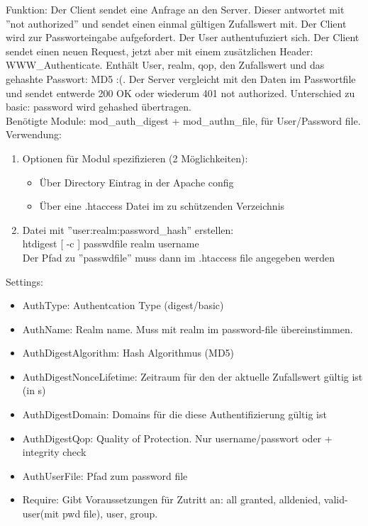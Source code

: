 \documentclass[12pt, a4paper]{report}
\begin{document}
Funktion: Der Client sendet eine Anfrage an den Server. Dieser antwortet mit ''not authorized'' und sendet einen einmal
gültigen Zufallswert mit. Der Client wird zur Passworteingabe aufgefordert. Der User authentufuziert sich.
Der Client sendet einen neuen Request, jetzt aber mit einem zusätzlichen Header: WWW\_Authenticate. Enthält
User, realm, qop, den Zufallswert und das gehashte Passwort: MD5 :(. Der Server vergleicht mit den Daten im Passwortfile
und sendet entwerde 200 OK oder wiederum 401 not authorized.
Unterschied zu basic: password wird gehashed übertragen.
\\Benötigte Module: mod\_auth\_digest + mod\_authn\_file, für User/Password file.\\
Verwendung:
\begin{enumerate}
	\item Optionen für Modul spezifizieren (2 Möglichkeiten):
	\begin{itemize}
		\item Über Directory Eintrag in der Apache config
		\item Über eine .htaccess Datei im zu schützenden Verzeichnis
	\end{itemize}
	\item Datei mit ''user:realm:password\_hash'' erstellen:\\
	htdigest [ -c ] passwdfile realm username\\
	Der Pfad zu ''passwdfile'' muss dann im .htaccess file angegeben werden
\end{enumerate}
Settings:
\begin{itemize}
	\item AuthType: Authentcation Type (digest/basic)
	\item AuthName: Realm name. Muss mit realm im password-file übereinstimmen.
	\item AuthDigestAlgorithm: Hash Algorithmus (MD5)
	\item AuthDigestNonceLifetime: Zeitraum für den der aktuelle Zufallswert gültig ist (in s)
	\item AuthDigestDomain: Domains für die diese Authentifizierung gültig ist
	\item AuthDigestQop: Quality of Protection. Nur username/passwort oder + integrity check
	\item AuthUserFile: Pfad zum password file
	\item Require: Gibt Voraussetzungen für Zutritt an: all granted, alldenied, valid-user(mit pwd file), user, group.
\end{itemize}
\end{document}
